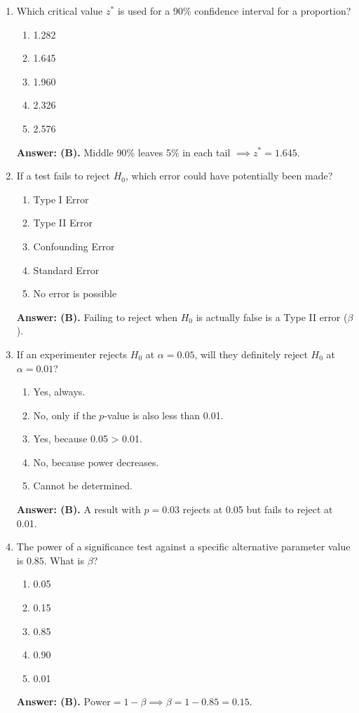 \begin{enumerate}[resume, leftmargin=1.5em]
  \item Which critical value $z^*$ is used for a 90\% confidence interval for a proportion?
  \begin{enumerate}[label=(\Alph*)]
    \item 1.282 \item 1.645 \item 1.960 \item 2.326 \item 2.576
  \end{enumerate}
  \textbf{Answer: (B).} Middle 90\% leaves 5\% in each tail $\implies z^* = 1.645$.

  \item If a test fails to reject $H_0$, which error could have potentially been made?
  \begin{enumerate}[label=(\Alph*)]
    \item Type I Error \item Type II Error \item Confounding Error \item Standard Error \item No error is possible
  \end{enumerate}
  \textbf{Answer: (B).} Failing to reject when $H_0$ is actually false is a Type II error ($\beta$).

  \item If an experimenter rejects $H_0$ at $\alpha = 0.05$, will they definitely reject $H_0$ at $\alpha = 0.01$?
  \begin{enumerate}[label=(\Alph*)]
    \item Yes, always. \item No, only if the $p$-value is also less than 0.01. \item Yes, because 0.05 > 0.01. \item No, because power decreases. \item Cannot be determined.
  \end{enumerate}
  \textbf{Answer: (B).} A result with $p = 0.03$ rejects at 0.05 but fails to reject at 0.01.

  \item The power of a significance test against a specific alternative parameter value is $0.85$. What is $\beta$?
  \begin{enumerate}[label=(\Alph*)]
    \item 0.05 \item 0.15 \item 0.85 \item 0.90 \item 0.01
  \end{enumerate}
  \textbf{Answer: (B).} $\text{Power} = 1 - \beta \implies \beta = 1 - 0.85 = 0.15$.


\end{enumerate}
